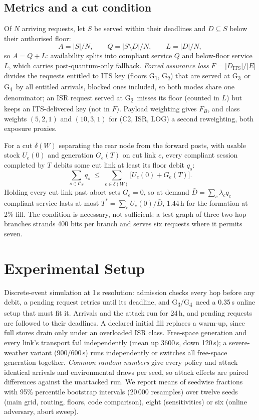 \documentclass[conference,a4paper]{IEEEtran}
\newcommand{\GI}{G\textsubscript{1}}
\newcommand{\GII}{G\textsubscript{2}}
\newcommand{\GIII}{G\textsubscript{3}}
\newcommand{\GIV}{G\textsubscript{4}}
\begin{document}
\subsection{Metrics and a cut condition}\label{sec:metrics}
Of $N$ arriving requests, let $S$ be served within their deadlines and $D\subseteq S$
below their authorised floor:
\begin{equation}\label{eq:metrics}
A=|S|/N,\qquad Q=|S\setminus D|/N,\qquad L=|D|/N,
\end{equation}
so $A=Q+L$: availability splits into compliant service $Q$ and below-floor service $L$, which carries post-quantum-only fallback. \emph{Forced assurance loss} $F=|D_{\mathrm{ITS}}|/|E|$ divides the
requests entitled to ITS key (floors \GI, \GII) that are served at \GIII\ or \GIV\ by all entitled arrivals, blocked ones included, so both modes share one denominator; an ISR request served at \GII\
misses its floor (counted in $L$) but keeps an ITS-delivered key (not in $F$).
Payload weighting gives $F_B$, and class weights $(5,2,1)$ and $(10,3,1)$
for (C2, ISR, LOG) a second reweighting, both exposure proxies.

For a cut $\delta(W)$ separating the rear node from the forward posts, with usable
stock $U_e(0)$ and generation $G_e(T)$ on cut link $e$, every compliant session
completed by $T$ debits some cut link at least its floor debit $q_s$:
\begin{equation}\label{eq:cut}
\textstyle\sum_{s\in\mathcal{C}_T} q_s\;\le\;\sum_{e\in\delta(W)}\bigl[U_e(0)+G_e(T)\bigr].
\end{equation}
Holding every cut link past abort sets $G_e=0$, so at demand
$\bar D=\sum_c\lambda_cq_c$ compliant service lasts at most $T^\ast=\sum_eU_e(0)/\bar
D$, 1.44\,h for the formation at 2\% fill. The condition is necessary, not
sufficient: a test graph of three two-hop branches strands 400 bits per branch and
serves six requests where it permits seven.

\section{Experimental Setup}\label{sec:setup}
Discrete-event simulation at 1\,s resolution: admission checks every hop before any
debit, a pending request retries until its deadline, and \GIII/\GIV\ need a 0.35\,s
online setup that must fit it. Arrivals and the attack run for 24\,h, and pending
requests are followed to their deadlines. A declared initial fill replaces a warm-up, since full stores drain only under an overloaded ISR class. Free-space
generation and every link's transport fail independently (mean up 3600\,s, down
120\,s); a severe-weather variant (900/600\,s) runs independently or switches all free-space generation together. \emph{Common random numbers} give every policy and attack identical arrivals and environmental draws per seed, so attack effects are paired differences against the unattacked run. We report means of seedwise fractions with
95\% percentile bootstrap intervals (20\,000 resamples) over twelve seeds (main grid, routing, floors, code comparison), eight (sensitivities) or six (online adversary, abort sweep).
\end{document}
